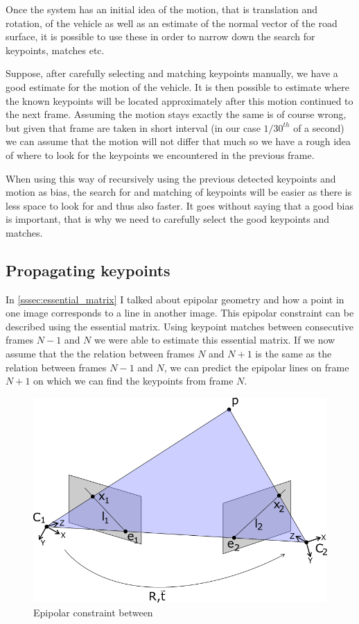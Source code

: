 Once the system has an initial idea of the motion, that is translation and rotation, of the vehicle as well as an estimate of the normal vector of the road surface, it is possible to use these in order to narrow down the search for keypoints, matches etc.\bigskip

Suppose, after carefully selecting and matching keypoints manually, we have a good estimate for the motion of the vehicle. It is then possible to estimate where the known keypoints will be located approximately after this motion continued to the next frame. Assuming the motion stays exactly the same is of course wrong, but given that frame are taken in short interval (in our case $1/30^{th}$ of a second) we can assume that the motion will not differ that much so we have a rough idea of where to look for the keypoints we encountered in the previous frame.\bigskip

When using this way of recursively using the previous detected keypoints and motion as bias, the search for and matching of keypoints will be easier as there is less space to look for and thus also faster. It goes without saying that a good bias is important, that is why we need to carefully select the good keypoints and matches.\bigskip

\subsection{Propagating keypoints}
In \autoref{sssec:essential_matrix} I talked about epipolar geometry and how a point in one image corresponds to a line in another image. This epipolar constraint can be described using the essential matrix. Using keypoint matches between consecutive frames $N-1$ and $N$ we were able to estimate this essential matrix. If we now assume that the the relation between frames $N$ and $N+1$ is the same as the relation between frames $N-1$ and $N$, we can predict the epipolar lines on frame $N+1$ on which we can find the keypoints from frame $N$.\bigskip

\begin{figure}
    \centering
    \includegraphics[width=1\textwidth]{figures/epipolar.png}
    \caption{Epipolar constraint between }
    \label{fig:epipoles}
\end{figure}

